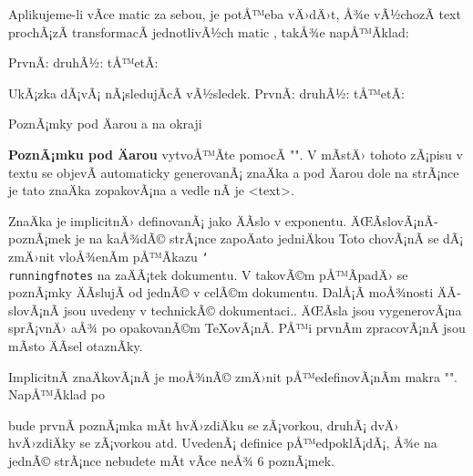 Aplikujeme-li vÃ­ce matic za sebou, je potÅ™eba vÄ›dÄ›t, Å¾e vÃ½chozÃ­ text
prochÃ¡zÃ­ transformacÃ­ jednotlivÃ½ch matic , takÅ¾e
napÅ™Ã­klad:

\begtt
PrvnÃ­: \pdfsave {}\pdfrestore
druhÃ½: \pdfsave {}\pdfrestore
tÅ™etÃ­: \pdfsave {}%
       \pdfrestore %
\endtt

\bigskip
UkÃ¡zka dÃ¡vÃ¡ nÃ¡sledujÃ­cÃ­ vÃ½sledek. PrvnÃ­: 
  \pdfsave {}\pdfrestore
druhÃ½:
  \pdfsave {}\pdfrestore
tÅ™etÃ­: 
  \pdfsave {}%
       \pdfrestore 
\bigskip\bigskip


\sec PoznÃ¡mky pod Äarou a na okraji

{\bf PoznÃ¡mku pod Äarou} 
vytvoÅ™Ã­te pomocÃ­ "". V mÃ­stÄ› tohoto zÃ¡pisu
v textu se objevÃ­ automaticky generovanÃ¡ znaÄka a pod Äarou dole na strÃ¡nce
je tato znaÄka zopakovÃ¡na a vedle nÃ­ je <text>. 

ZnaÄka je implicitnÄ› definovanÃ¡ jako ÄÃ­slo v exponentu.
ÄŒÃ­slovÃ¡nÃ­ poznÃ¡mek je na kaÅ¾dÃ© strÃ¡nce zapoÄato
jedniÄkou\fnote
{Toto chovÃ¡nÃ­ se dÃ¡ zmÄ›nit vloÅ¾enÃ­m pÅ™Ã­kazu {\tt\char`\\runningfnotes} na
zaÄÃ¡tek dokumentu. V takovÃ©m pÅ™Ã­padÄ› se poznÃ¡mky ÄÃ­slujÃ­ od jednÃ© v celÃ©m
dokumentu. DalÅ¡Ã­ moÅ¾nosti ÄÃ­slovÃ¡nÃ­ jsou uvedeny v technickÃ© dokumentaci.}.
ÄŒÃ­sla jsou vygenerovÃ¡na sprÃ¡vnÄ› aÅ¾ po
opakovanÃ©m \TeX{}ovÃ¡nÃ­. PÅ™i prvnÃ­m zpracovÃ¡nÃ­ jsou mÃ­sto ÄÃ­sel otaznÃ­ky.

ImplicitnÃ­ znaÄkovÃ¡nÃ­ je moÅ¾nÃ© zmÄ›nit pÅ™edefinovÃ¡nÃ­m makra "\thefnote".
NapÅ™Ã­klad po

\begtt
\def\thefnote{\ifcase\locfnum\or
   *\or**\or***\or$^{\dag}$\or$^{\ddag}$\or$^{\dag\dag}$\fi)}
\endtt
%
bude prvnÃ­ poznÃ¡mka mÃ­t hvÄ›zdiÄku se zÃ¡vorkou, druhÃ¡ dvÄ› hvÄ›zdiÄky se
zÃ¡vorkou atd. UvedenÃ¡ definice pÅ™edpoklÃ¡dÃ¡, Å¾e na jednÃ© strÃ¡nce nebudete mÃ­t
vÃ­ce neÅ¾ 6 poznÃ¡mek.

